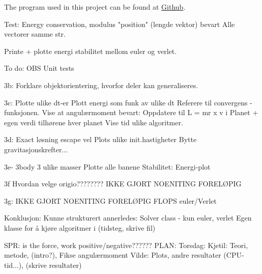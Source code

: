 


The program used in this project can be found at \href{https://github.com/kjetka/Project3}{Github}. 




Test: 		Energy conservation, modulus "position" (lengde vektor) bevart
				Alle vectorer samme str.



	Printe + plotte energi stabilitet mellom euler og verlet.


To do:
	OBS Unit tests
	
	3b:
								Forklare objektorientering, hvorfor deler kan generaliseres. 
	
	3c: 					  Plotte ulike dt-er
								Plott energi som funk av ulike dt
								Referere til convergens - funksjonen.
								Vise at angulærmoment bevart:
										Oppdatere til L = mr x v i Planet + egen verdi tilhørene hver planet
								Vise tid ulike algoritmer. 

	3d: 					  Exact løsning escape vel
								Plots ulike init.hastigheter
								Bytte gravitasjonskrefter... 
								
	3e- 3body			3 ulike masser
								Plotte alle banene
								Stabilitet: Energi-plot
	
	3f							Hvordan velge origio????????
								IKKE GJORT NOENITING FORELØPIG
	
	3g:							IKKE GJORT NOENITING FORELØPIG					
	FLOPS euler/Verlet
		

Konklusjon: 
	Kunne strukturert annerledes: 
		Solver class  - kun euler, verlet
		Egen klasse for å kjøre algoritmer i (tidsteg, skrive fil)
		
		
		SPR: is the force, work positive/negative??????
PLAN: 
Torsdag:
	Kjetil: Teori, metode, (intro?), Fikse angulærmoment
	Vilde: Plots, andre resultater (CPU-tid...),  (skrive resultater)